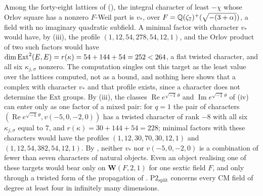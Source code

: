 \begin{remark}
\label{rem:sextictargets}
Among the forty-eight lattices of 
(), the integral
character of least $-\chi$ whose Orlov square has a nonzero $F$-Weil part is
$v_{*}$, over $F=\mathbb{Q}(\zeta_{7})^{+}(\sqrt{-(3+\alpha)})$, a field with no
imaginary quadratic subfield. A minimal factor with character $v_{*}$ would
have, by (iii), the profile $(1,12,54,278,54,12,1)$,
and the Orlov product of two such factors would have
$\dim\operatorname{Ext}^{2}(E,E)=r(\kappa)=54+144+54=252<264$, a flat twisted character,
and all six $\kappa_{j,\sigma}$ nonzero. The computation singles out this
target as the least value over the lattices computed, not as a bound, and
nothing here shows that a complex with character $v_{*}$ and that profile
exists, since a character does not determine the Ext groups. By
(iii), the classes $\operatorname{Re}
e^{\sqrt{-1}\,\theta}$ and $\operatorname{Im}e^{\sqrt{-1}\,\theta}$ of
(iv) can enter only as one factor of a mixed pair:
for $q=1$ the pair of characters $(\operatorname{Re}e^{\sqrt{-1}\,\theta},
v(-5,0,-2,0))$ has a twisted character of rank $-8$ with all six
$\kappa_{j,\sigma}$ equal to $7$, and $r(\kappa)=30+144+54=228$; minimal
factors with these characters would have the profiles
$(1,12,30,70,30,12,1)$ and $(1,12,54,382,54,12,1)$. By
, neither $v_{*}$ nor $v(-5,0,-2,0)$ is a combination
of fewer than seven characters of natural objects. Even an object realising
one of these targets would bear only on $\mathbf{W}(F,2,1)$ for one sextic
field $F$, and only through a twisted form of the propagation of
. $\mathrm{P2}_{\mathrm{split}}$ concerns every
CM field of degree at least four in infinitely many dimensions.
\end{remark}

